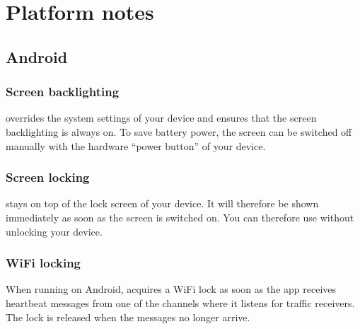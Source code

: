 \documentclass[letterpaper,10pt,english]{sphinxmanual}
\begin{document}
\begin{sphinxVerbatim}[commandchars=\\\{\}]
         
     
     
   
\end{sphinxVerbatim}


\chapter{Platform notes}
\label{\detokenize{03-reference/platform:platform-notes}}\label{\detokenize{03-reference/platform::doc}}

\section{Android}
\label{\detokenize{03-reference/platform:android}}

\subsection{Screen backlighting}
\label{\detokenize{03-reference/platform:screen-backlighting}}
\sphinxAtStartPar
{} overrides the system settings of your device and
ensures that the screen backlighting is always on.  To save battery power, the
screen can be switched off manually with the hardware “power button” of your
device.


\subsection{Screen locking}
\label{\detokenize{03-reference/platform:screen-locking}}
\sphinxAtStartPar
{} stays on top of the lock screen of your device.
It will therefore be shown immediately as soon as the screen is switched on.
You can therefore use  without unlocking your
device.


\subsection{Wi\sphinxhyphen{}Fi locking}
\label{\detokenize{03-reference/platform:wi-fi-locking}}
\sphinxAtStartPar
When running on Android,  acquires a Wi\sphinxhyphen{}Fi lock as
soon as the app receives heartbeat messages from one of the channels where it
listens for traffic receivers.  The lock is released when the messages no longer
arrive.
\end{document}
